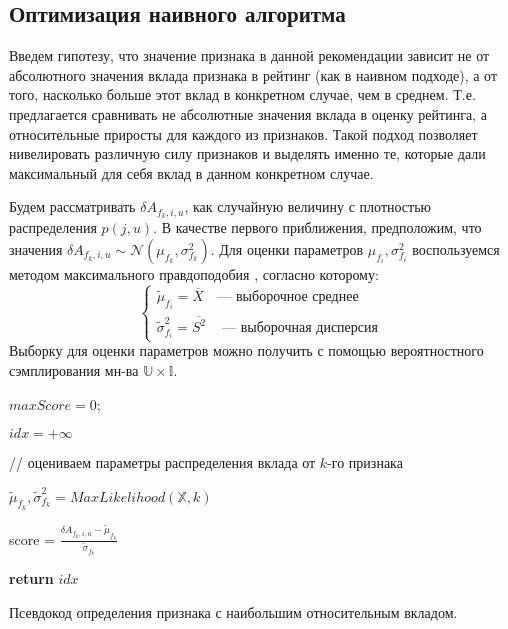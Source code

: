\documentclass[12pt,a4paper]{report}
\begin{document}
\subsection{Оптимизация наивного алгоритма}
Введем гипотезу, что значение признака в данной рекомендации зависит не от абсолютного значения вклада признака в рейтинг (как в наивном подходе), а от того, насколько больше этот вклад в конкретном случае, чем в среднем. Т.е. предлагается сравнивать не абсолютные значения вклада в оценку рейтинга, а относительные приросты для каждого из признаков.
Такой подход позволяет нивелировать различную силу признаков и выделять именно те, которые дали максимальный для себя вклад в данном конкретном случае.

Будем рассматривать $\delta A_{f_k, i, u}$, как случайную величину с плотностью распределения $p(j, u)$.
В качестве первого приближения, предположим, что значения $\delta A_{f_k, i, u} \sim\mathcal{N}(\mu_{f_k}, \sigma_{f_k}^2)$.
Для оценки параметров $\mu_{f_i}, \sigma_{f_i}^2$ воспользуемся методом максимального правдоподобия \cite{Mle}, согласно которому:
\begin{equation*}
\begin{cases}
\tilde{\mu}_{f_i} = \overline{X} &\text{--- выборочное среднее} 
\\ \tilde{\sigma}_{f_i}^2 = \overline{S^2} &\text{ --- выборочная дисперсия}
\end{cases}
\end{equation*}
Выборку для оценки параметров можно получить с помощью вероятностного сэмплирования мн-ва $\mathbb{U} \times \mathbb{I}$.


\begin{algorithm}[H]
\SetAlgoLined
{}

$maxScore = 0$;

$idx = +\infty$

 {

// оцениваем параметры распределения вклада от $k$-го признака

$\tilde{\mu}_{f_k}, \tilde{\sigma}_{f_k}^2 = MaxLikelihood(\mathbb{X}, k)$

score = $\frac{\delta A_{f_k, i, u} - \tilde{\mu}_{f_k}}{\tilde{\sigma}_{f_k}}$

}

\textbf{return} $idx$
\caption{Псевдокод определения признака с наибольшим относительным вкладом.}
\label{alg:normalAI}
\end{algorithm}
\end{document}
